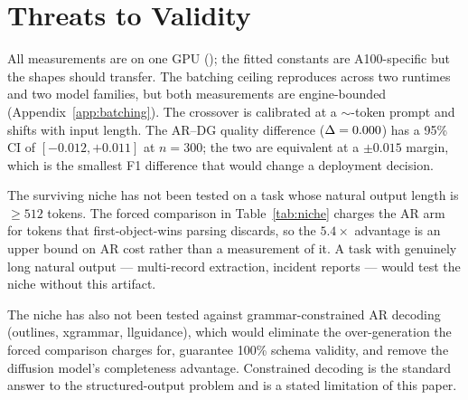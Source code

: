 \section{Threats to Validity}
\label{sec:threats}

All measurements are on one GPU (\gpuModel{}); the fitted constants are
A100-specific but the shapes should transfer. The batching ceiling reproduces
across two runtimes and two model families, but both measurements are
engine-bounded (Appendix~\ref{app:batching}). The crossover is calibrated at
a $\sim$-token prompt and shifts with input length. The AR--DG
quality difference ($\Delta = 0.000$) has a 95\% CI of $[-0.012,
+0.011]$ at $n=300$; the two are equivalent at a $\pm 0.015$ margin, which is
the smallest F1 difference that would change a deployment decision.

The surviving niche has not been tested on a task whose natural output length
is $\geq 512$ tokens. The forced comparison in Table~\ref{tab:niche} charges
the AR arm for tokens that first-object-wins parsing discards, so the
$5.4\times$ advantage is an upper bound on AR cost rather than a measurement
of it. A task with genuinely long natural output --- multi-record extraction,
incident reports --- would test the niche without this artifact.

The niche has also not been tested against grammar-constrained AR decoding
(outlines, xgrammar, llguidance), which would eliminate the over-generation
the forced comparison charges for, guarantee 100\% schema validity, and
remove the diffusion model's completeness advantage. Constrained decoding is
the standard answer to the structured-output problem and is a stated
limitation of this paper.

